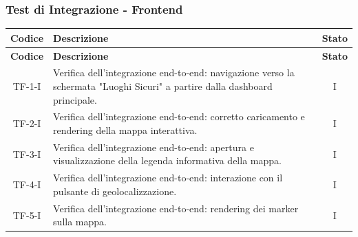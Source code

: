 \documentclass[a4paper,12pt]{article}
\begin{document}
\subsubsection{Test di Integrazione - Frontend}\label{sec:test_integrazione_frontend}
\begin{longtable}{|c|p{10cm}|c|}
    \hline
    \rowcolor{gray!30}
    \textbf{Codice} & \textbf{Descrizione} & \textbf{Stato} \\
    \hline
    \endfirsthead

    \hline
    \rowcolor{gray!30}
    \textbf{Codice} & \textbf{Descrizione} & \textbf{Stato} \\
    \hline
    \endhead

    \hline
    \endfoot

    \hline
    \endlastfoot

    TF-1-I & Verifica dell'integrazione end-to-end: navigazione verso la schermata "Luoghi Sicuri" a partire dalla dashboard principale. & I \\
    \hline
    TF-2-I & Verifica dell'integrazione end-to-end: corretto caricamento e rendering della mappa interattiva. & I \\
    \hline
    TF-3-I & Verifica dell'integrazione end-to-end: apertura e visualizzazione della legenda informativa della mappa. & I \\
    \hline
    TF-4-I & Verifica dell'integrazione end-to-end: interazione con il pulsante di geolocalizzazione. & I \\
    \hline
    TF-5-I & Verifica dell'integrazione end-to-end: rendering dei marker sulla mappa. & I \\
    \hline


\end{longtable}
\end{document}
